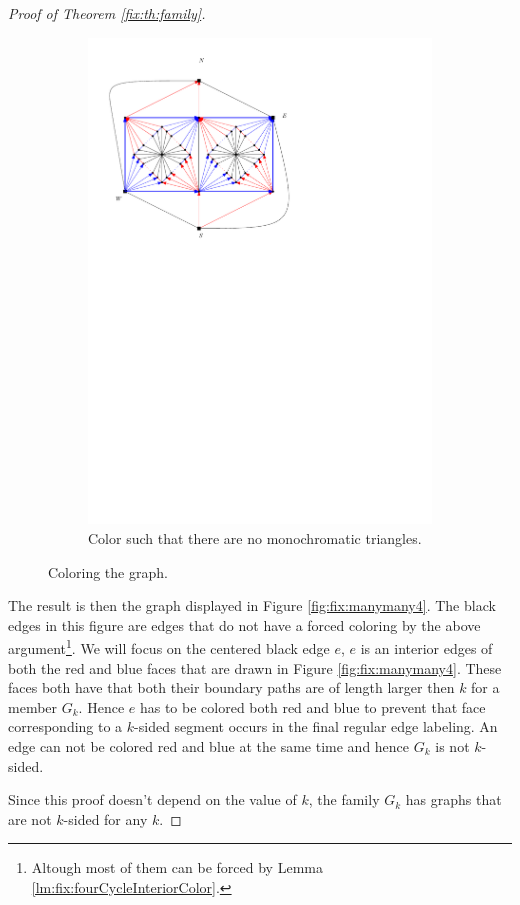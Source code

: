 \begin{proof}[Proof of Theorem \ref{fix:th:family}]
\begin{figure}[h]
\begin{subfigure}[t]{0.3\textwidth}
      \includegraphics[width=\textwidth]{fixExtension/img/manymany3}
      \caption{Color such that there are no monochromatic triangles.}
      \label{fig:fix:manymany3}
    \end{subfigure}
    \caption{Coloring the graph.}
    \label{fig:fix:coloring}
  \end{figure}

  The result is then the graph displayed in Figure \ref{fig:fix:manymany4}. The black edges in this figure are edges that do not have a forced coloring by the above argument\footnote{Altough most of them can be forced by Lemma \ref{lm:fix:fourCycleInteriorColor}.}.
  We will focus on the centered black edge $e$, $e$ is an interior edges of both the red and blue faces that are drawn  in Figure \ref{fig:fix:manymany4}. These faces both have that both their boundary paths are of length larger then $k$ for a member $G_k$. Hence $e$ has to be colored both red and blue to prevent that face corresponding to a $k$-sided segment occurs in the final regular edge labeling. An edge can not be colored red and blue at the same time and hence $G_k$ is not $k$-sided.

  Since this proof doesn't depend on the value of $k$, the family $G_k$ has graphs that are not $k$-sided for any $k$.
\end{proof}


